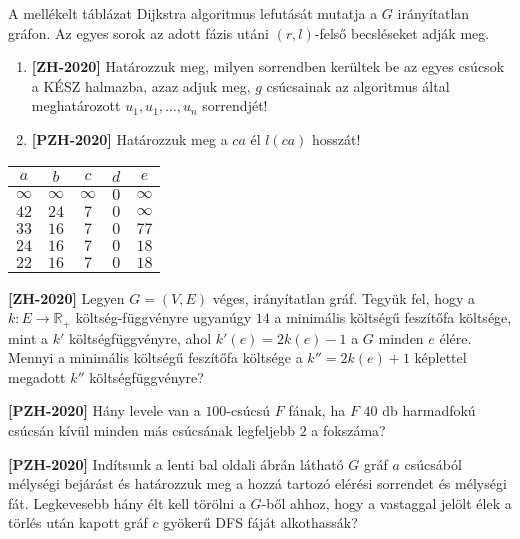 \documentclass[a4paper, 12pt]{article}
\begin{document}
\begin{enumerate}
        \begin{minipage}{0.6\textwidth}
            \item A mellékelt táblázat Dijkstra algoritmus lefutását mutatja a $G$ irányítatlan gráfon. Az egyes sorok az adott fázis utáni $(r, l)$-felső becsléseket adják meg. 
            \begin{enumerate}
                \item \textbf{[ZH-2020]} Határozzuk meg, milyen sorrendben kerültek be az egyes csúcsok a KÉSZ halmazba, azaz adjuk meg, $g$ csúcsainak az algoritmus által meghatározott $u_1, u_1, \ldots, u_n$ sorrendjét!
                \item \textbf{[PZH-2020]} Határozzuk meg a $ca$ él $l(ca)$ hosszát!
            \end{enumerate}
            
        \end{minipage}
        \begin{minipage}{0.3\textwidth}
            \centering
            \begin{tabular}{ccccc}
                $a$ & $b$ & $c$ & $d$ & $e$ \\ \hline
                $\infty$ & $\infty$ & $\infty$ & $0$ & $\infty$  \\
                $42$ & $24$ & $7$ & $0$ & $\infty$  \\
                $33$ & $16$ & $7$ & $0$ & $77$  \\
                $24$ & $16$ & $7$ & $0$ & $18$  \\
                $22$ & $16$ & $7$ & $0$ & $18$  \\
            \end{tabular}
        \end{minipage}
        \item \textbf{[ZH-2020]} Legyen $G=(V,E)$ véges, irányítatlan gráf. Tegyük fel, hogy a $k:E\rightarrow\mathbb{R}_{+}$ költség-függvényre ugyanúgy $14$ a minimális költségű feszítőfa költsége, mint a $k'$ költségfüggvényre, ahol $k'(e)=2k(e)-1$ a $G$ minden $e$ élére. Mennyi a minimális költségű feszítőfa költsége a $k''=2k(e)+1$ képlettel megadott $k''$ költségfüggvényre?
        \item \textbf{[PZH-2020]} Hány levele van a $100$-csúcsú $F$ fának, ha $F$ $40$ db harmadfokú csúcsán kívül minden más csúcsának legfeljebb $2$ a fokszáma?
        
        \item \textbf{[PZH-2020]} Indítsunk a lenti bal oldali ábrán látható $G$ gráf $a$ csúcsából mélységi bejárást és határozzuk meg a hozzá tartozó elérési sorrendet és mélységi fát. Legkevesebb hány élt kell törölni a $G$-ből ahhoz, hogy a vastaggal jelölt élek a törlés után kapott gráf $c$ gyökerű DFS fáját alkothassák?
        

\end{enumerate}
\end{document}
